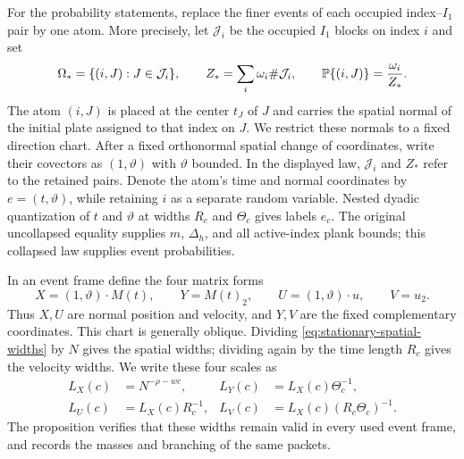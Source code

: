 For the probability statements, replace the finer events of each
occupied index--$I_1$ pair by one atom. More precisely, let
$\mathcal J_i$ be the occupied $I_1$ blocks on index $i$ and set
\[
 \Omega_* =\{(i,J):J\in\mathcal J_i\},\qquad
 Z_* =\sum_i\omega_i\#\mathcal J_i,\qquad
 \mathbb P\{(i,J)\}=\frac{\omega_i}{Z_*}.
\]
The atom $(i,J)$ is placed at the center $t_J$ of $J$ and carries the
spatial normal of the initial plate assigned to that index on $J$.
We restrict these normals to a fixed direction chart. After a fixed
orthonormal spatial change of coordinates, write their covectors as
$(1,\vartheta)$ with $\vartheta$ bounded. In the displayed law,
$\mathcal J_i$ and $Z_*$ refer to the retained pairs. Denote the atom's
time and normal coordinates by $e=(t,\vartheta)$, while retaining $i$
as a separate random variable. Nested dyadic quantization of $t$ and
$\vartheta$ at widths $R_c$ and $\Theta_c$ gives labels $e_c$.
The original uncollapsed equality supplies $m$, $\Delta_h$, and all
active-index plank bounds; this collapsed law supplies event probabilities.

In an event frame define the four matrix forms
\begin{equation}
 X=(1,\vartheta)\cdot M(t),\qquad Y=M(t)_2,
 \qquad U=(1,\vartheta)\cdot u,\qquad V=u_2.
 \label{eq:stationary-matrix-forms}
\end{equation}
Thus $X,U$ are normal position and velocity, and $Y,V$ are the fixed
complementary coordinates. This chart is generally oblique. Dividing
\eqref{eq:stationary-spatial-widths} by $N$ gives the spatial widths;
dividing again by the time length $R_c$ gives the velocity widths.
We write these four scales as
\begin{equation}
\begin{aligned}
 L_X(c)&=N^{-\rho-wc},&
 L_Y(c)&=L_X(c)\Theta_c^{-1},\\
 L_U(c)&=L_X(c)R_c^{-1},&
 L_V(c)&=L_X(c)(R_c\Theta_c)^{-1}.
\end{aligned}
\label{eq:estimate-widths}
\end{equation}
The proposition verifies that these widths remain valid in every used
event frame, and records the masses and branching of the same packets.

